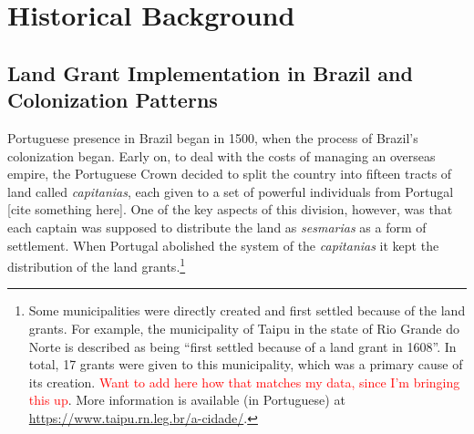 \documentclass[11pt]{article}
\newcommand{\red}[1]{\textcolor{red}{#1}}
\begin{document}
\section{Historical Background}
\label{sec:historical_background}

\subsection{Land Grant Implementation in Brazil and Colonization Patterns}

\begin{comment}
\hl{Tem que falar sobre as Capitanias Hereditarias e como as sesmarias tinham que ser doadas ja nessa epoca.}
\end{comment}


Portuguese presence in Brazil began in 1500, when the process of Brazil's colonization began. 
Early on, to deal with the costs of managing an overseas empire, the Portuguese Crown decided to split the country into fifteen tracts of land called \textit{capitanias}, each given to a set of powerful individuals from Portugal [cite something here].
One of the key aspects of this division, however, was that each captain was supposed to distribute the land as \textit{sesmarias} as a form of settlement. 
When Portugal abolished the system of the \textit{capitanias} it kept the distribution of the land grants.\footnote{Some municipalities were directly created and first settled because of the land grants. For example, the municipality of Taipu in the state of Rio Grande do Norte is described as being ``first settled because of a land grant in 1608''. In total, 17 grants were given to this municipality, which was a primary cause of its creation. \red{Want to add here how that matches my data, since I'm bringing this up}. More information is available (in Portuguese) at \url{https://www.taipu.rn.leg.br/a-cidade/}.}
\end{document}
